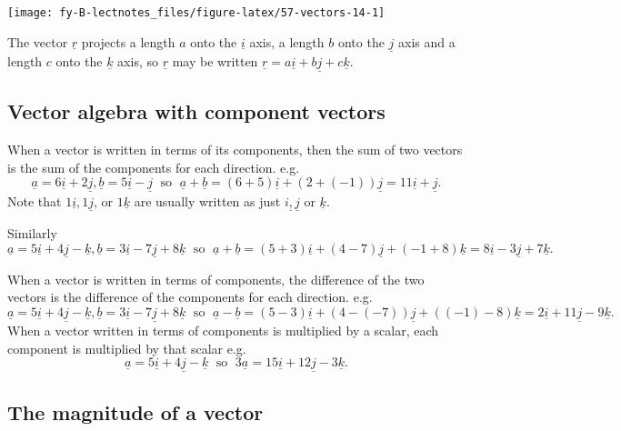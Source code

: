 \documentclass[
  11pt,
  oneside]{book}
\newcommand{\slide}{}
\theoremstyle{definition}
\theoremstyle{definition}
\theoremstyle{definition}
\theoremstyle{definition}
\theoremstyle{remark}
\begin{document}
\begin{center}\texttt{[image: fy-B-lectnotes\_files/figure-latex/57-vectors-14-1]} \end{center}

The vector \(\underline r\) projects a length \(a\) onto the \(\underline i\) axis, a length \(b\) onto the \(\underline j\) axis and a length \(c\) onto the \(\underline k\) axis, so \(\underline r\) may be written \(\underline r = a\underline i + b\underline j + c\underline k\).

\slide

\subsection{Vector algebra with component vectors}\label{vector-algebra-with-component-vectors}

When a vector is written in terms of its components, then the sum of two vectors is the sum of the components for each direction. e.g.
\[
\underline a = 6\underline i + 2\underline j, \underline b = 5\underline i - \underline j\;\text{ so }\;\underline a + \underline b = (6 + 5)\underline i + (2 + (-1))\underline j = 11\underline i + \underline j.
\]
Note that \(1\underline i, 1\underline j\), or \(1\underline k\) are usually written as just \(i\underline , \underline j\) or \(\underline k\).

Similarly
\[
\underline a = 5\underline i + 4\underline j - \underline k, \underline b = 3\underline i - 7\underline j + 8\underline k\;\text{ so }\; \underline a + \underline b = (5+3)\underline i + (4 - 7)\underline j + (-1 + 8)\underline k = 8\underline i -3\underline j + 7\underline k.
\]

When a vector is written in terms of components, the difference of the two vectors is the difference of the components for each direction. e.g.
\[
\underline a = 5\underline i + 4\underline j - \underline k, \underline b = 3\underline i - 7\underline j + 8\underline k\;\text{ so }\; \underline a - \underline b = (5 - 3)\underline i + (4 - (-7))\underline j + ((-1) - 8)\underline k = 2\underline i + 11\underline j -9\underline k.
\]
When a vector written in terms of components is multiplied by a scalar, each component is multiplied by that scalar e.g.
\[
\underline a = 5\underline i + 4\underline j - \underline k\;\text{ so }\;3\underline a = 15\underline i + 12\underline j - 3\underline k.
\]
\slide

\subsection{The magnitude of a vector}\label{the-magnitude-of-a-vector}
\end{document}
